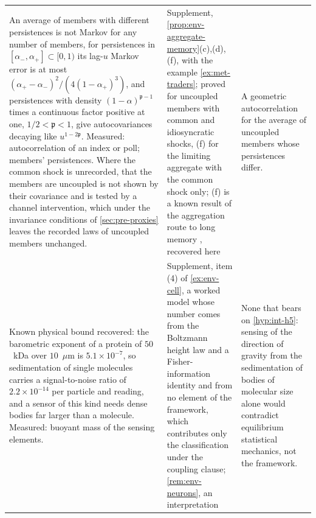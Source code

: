 \begin{longtable}{@{}>{\raggedright\arraybackslash}p{6.5cm}>{\raggedright\arraybackslash}p{3.9cm}>{\raggedright\arraybackslash}p{5.1cm}@{}}
\addlinespace
An average of members with different persistences is not Markov for any number of members, for persistences in $[\alpha_-,\alpha_+]\subset[0,1)$ its lag-$u$ Markov error is at most $(\alpha_+-\alpha_-)^2/(4(1-\alpha_+)^3)$, and persistences with density $(1-\alpha)^{\mathfrak p-1}$ times a continuous factor positive at one, $1/2<\mathfrak p<1$, give autocovariances decaying like $u^{1-2\mathfrak p}$. Measured: autocorrelation of an index or poll; members' persistences. Where the common shock is unrecorded, that the members are uncoupled is not shown by their covariance and is tested by a channel intervention, which under the invariance conditions of \cref{sec:pre-proxies} leaves the recorded laws of uncoupled members unchanged. & Supplement, \cref{prop:env-aggregate-memory}(c),(d),(f), with the example \cref{ex:met-traders}; proved for uncoupled members with common and idiosyncratic shocks, (f) for the limiting aggregate with the common shock only; (f) is a known result of the aggregation route to long memory \citep{granger1980long,leipus2013aggregation}, recovered here & A geometric autocorrelation for the average of uncoupled members whose persistences differ.\\
\addlinespace
Known physical bound recovered: the barometric exponent of a protein of $50$~kDa over $10$~$\mu$m is $5.1\times10^{-7}$, so sedimentation of single molecules carries a signal-to-noise ratio of $2.2\times10^{-14}$ per particle and reading, and a sensor of this kind needs dense bodies far larger than a molecule. Measured: buoyant mass of the sensing elements. & Supplement, item (4) of \cref{ex:env-cell}, a worked model whose number comes from the Boltzmann height law and a Fisher-information identity and from no element of the framework, which contributes only the classification under the coupling clause; \cref{rem:env-neurons}, an interpretation & None that bears on \cref{hyp:int-h5}: sensing of the direction of gravity from the sedimentation of bodies of molecular size alone would contradict equilibrium statistical mechanics, not the framework.\\
\end{longtable}
\endgroup


